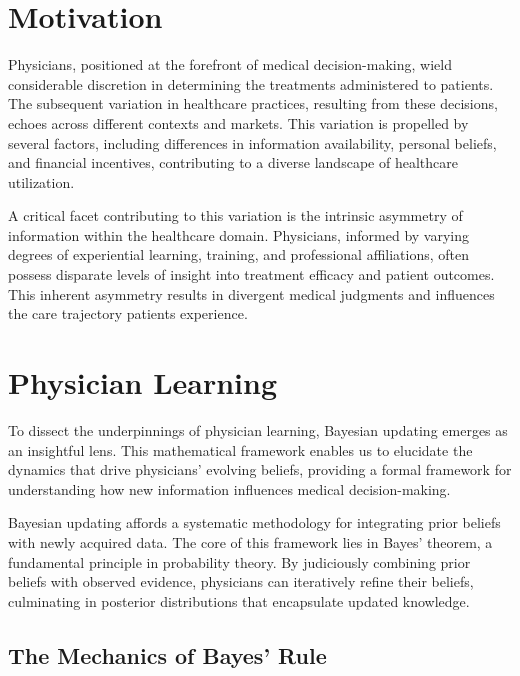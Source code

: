 \documentclass[
  letterpaper,
  DIV=11,
  numbers=noendperiod]{scrreport}
\theoremstyle{definition}
\theoremstyle{remark}
\begin{document}
\hypertarget{motivation}{%
\section{Motivation}\label{motivation}}

Physicians, positioned at the forefront of medical decision-making,
wield considerable discretion in determining the treatments administered
to patients. The subsequent variation in healthcare practices, resulting
from these decisions, echoes across different contexts and markets. This
variation is propelled by several factors, including differences in
information availability, personal beliefs, and financial incentives,
contributing to a diverse landscape of healthcare utilization.

A critical facet contributing to this variation is the intrinsic
asymmetry of information within the healthcare domain. Physicians,
informed by varying degrees of experiential learning, training, and
professional affiliations, often possess disparate levels of insight
into treatment efficacy and patient outcomes. This inherent asymmetry
results in divergent medical judgments and influences the care
trajectory patients experience.

\hypertarget{physician-learning-1}{%
\section{Physician Learning}\label{physician-learning-1}}

To dissect the underpinnings of physician learning, Bayesian updating
emerges as an insightful lens. This mathematical framework enables us to
elucidate the dynamics that drive physicians' evolving beliefs,
providing a formal framework for understanding how new information
influences medical decision-making.

Bayesian updating affords a systematic methodology for integrating prior
beliefs with newly acquired data. The core of this framework lies in
Bayes' theorem, a fundamental principle in probability theory. By
judiciously combining prior beliefs with observed evidence, physicians
can iteratively refine their beliefs, culminating in posterior
distributions that encapsulate updated knowledge.

\hypertarget{the-mechanics-of-bayes-rule}{%
\subsection{The Mechanics of Bayes'
Rule}\label{the-mechanics-of-bayes-rule}}
\end{document}
